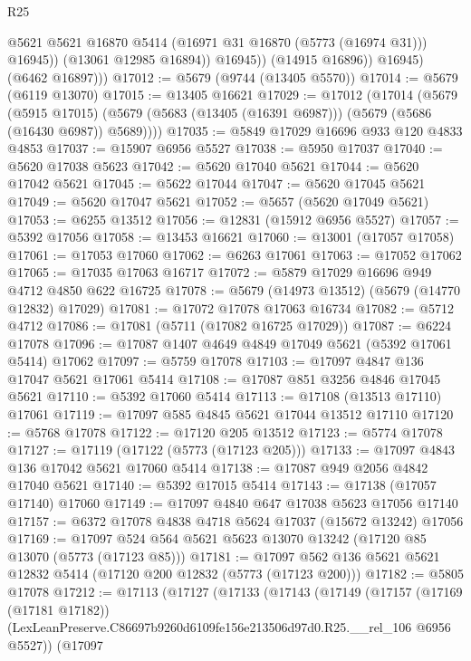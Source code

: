 \begin{lexlean}{R25}
\begin{coremodule}
                      @5621
                      @5621
                      @16870
                      @5414
                      (@16971 @31 @16870 (@5773 (@16974 @31)))
                      @16945))
                  (@13061 @12985 @16894))
                @16945))
            (@14915 @16896))
          @16945)
        (@6462 @16897)))
@17012 := @5679 (@9744 (@13405 @5570))
@17014 := @5679 (@6119 @13070)
@17015 := @13405 @16621
@17029 := @17012
    (@17014
      (@5679
        (@5915 @17015)
        (@5679 (@5683 (@13405 (@16391 @6987))) (@5679 (@5686 (@16430 @6987)) @5689))))
@17035 := @5849 @17029 @16696 @933 @120 @4833 @4853
@17037 := @15907 @6956 @5527
@17038 := @5950 @17037
@17040 := @5620 @17038 @5623
@17042 := @5620 @17040 @5621
@17044 := @5620 @17042 @5621
@17045 := @5622 @17044
@17047 := @5620 @17045 @5621
@17049 := @5620 @17047 @5621
@17052 := @5657 (@5620 @17049 @5621)
@17053 := @6255 @13512
@17056 := @12831 (@15912 @6956 @5527)
@17057 := @5392 @17056
@17058 := @13453 @16621
@17060 := @13001 (@17057 @17058)
@17061 := @17053 @17060
@17062 := @6263 @17061
@17063 := @17052 @17062
@17065 := @17035 @17063 @16717
@17072 := @5879 @17029 @16696 @949 @4712 @4850 @622 @16725
@17078 := @5679 (@14973 @13512) (@5679 (@14770 @12832) @17029)
@17081 := @17072 @17078 @17063 @16734
@17082 := @5712 @4712
@17086 := @17081 (@5711 (@17082 @16725 @17029))
@17087 := @6224 @17078
@17096 := @17087 @1407 @4649 @4849 @17049 @5621 (@5392 @17061 @5414) @17062
@17097 := @5759 @17078
@17103 := @17097 @4847 @136 @17047 @5621 @17061 @5414
@17108 := @17087 @851 @3256 @4846 @17045 @5621
@17110 := @5392 @17060 @5414
@17113 := @17108 (@13513 @17110) @17061
@17119 := @17097 @585 @4845 @5621 @17044 @13512 @17110
@17120 := @5768 @17078
@17122 := @17120 @205 @13512
@17123 := @5774 @17078
@17127 := @17119 (@17122 (@5773 (@17123 @205)))
@17133 := @17097 @4843 @136 @17042 @5621 @17060 @5414
@17138 := @17087 @949 @2056 @4842 @17040 @5621
@17140 := @5392 @17015 @5414
@17143 := @17138 (@17057 @17140) @17060
@17149 := @17097 @4840 @647 @17038 @5623 @17056 @17140
@17157 := @6372 @17078 @4838 @4718 @5624 @17037 (@15672 @13242) @17056
@17169 := @17097 @524 @564 @5621 @5623 @13070 @13242 (@17120 @85 @13070 (@5773 (@17123 @85)))
@17181 := @17097 @562 @136 @5621 @5621 @12832 @5414 (@17120 @200 @12832 (@5773 (@17123 @200)))
@17182 := @5805 @17078
@17212 := @17113
    (@17127
      (@17133
        (@17143
          (@17149
            (@17157
              (@17169 (@17181 @17182))
              (LexLeanPreserve.C86697b9260d6109fe156e213506d97d0.R25.__rel_106 @6956 @5527))
            (@17097

\end{coremodule}
\end{lexlean}
